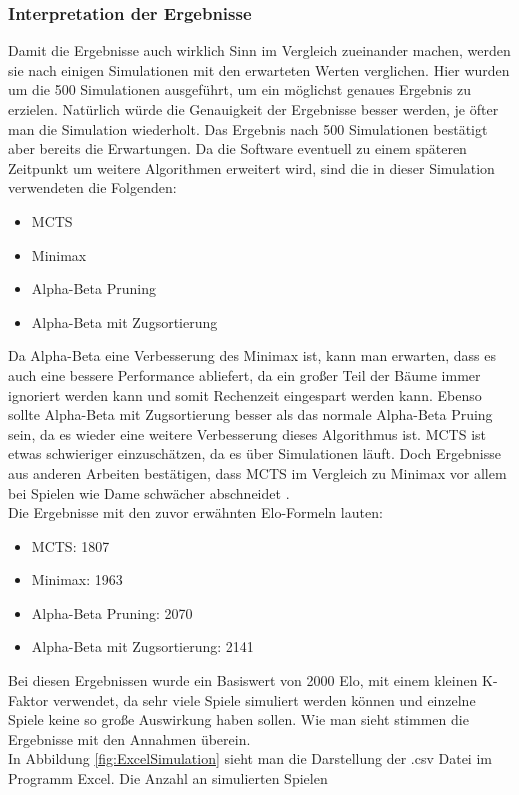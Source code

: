 \documentclass[12pt,a4paper,bibliography=totocnumbered,listof=totocnumbered]{article}
\begin{document}
\subsubsection{Interpretation der Ergebnisse}
Damit die Ergebnisse auch wirklich Sinn im Vergleich zueinander machen, werden sie nach einigen Simulationen mit den erwarteten Werten verglichen.
Hier wurden um die 500 Simulationen ausgeführt, um ein möglichst genaues Ergebnis zu erzielen. Natürlich würde die Genauigkeit der Ergebnisse 
besser werden, je öfter man die Simulation wiederholt. Das Ergebnis nach 500 Simulationen bestätigt aber bereits die Erwartungen.
Da die Software eventuell zu einem späteren Zeitpunkt um weitere Algorithmen erweitert wird, sind die in dieser Simulation verwendeten die Folgenden:
\begin{itemize}
    \item MCTS
    \item Minimax 
    \item Alpha-Beta Pruning
    \item Alpha-Beta mit Zugsortierung 
\end{itemize}
Da Alpha-Beta eine Verbesserung des Minimax ist, kann man erwarten, dass es auch eine bessere Performance abliefert, da ein großer Teil der Bäume 
immer ignoriert werden kann und somit Rechenzeit eingespart werden kann. Ebenso sollte Alpha-Beta mit Zugsortierung besser als das normale 
Alpha-Beta Pruing sein, da es wieder eine weitere Verbesserung dieses Algorithmus ist. MCTS ist etwas schwieriger einzuschätzen, da 
es über Simulationen läuft. Doch Ergebnisse aus anderen Arbeiten bestätigen, dass MCTS im Vergleich zu Minimax vor allem bei Spielen wie Dame 
schwächer abschneidet \cite{MiniaxMCTScomparison}.
\\
Die Ergebnisse mit den zuvor erwähnten Elo-Formeln lauten:
\begin{itemize}
    \item MCTS: 1807
    \item Minimax: 1963
    \item Alpha-Beta Pruning: 2070
    \item Alpha-Beta mit Zugsortierung: 2141
\end{itemize}
Bei diesen Ergebnissen wurde ein Basiswert von 2000 Elo, mit einem kleinen K-Faktor verwendet, da sehr viele Spiele simuliert werden können und 
einzelne Spiele keine so große Auswirkung haben sollen. Wie man sieht stimmen die Ergebnisse mit den Annahmen überein.
\\
In Abbildung \ref{fig:ExcelSimulation} sieht man die Darstellung der .csv Datei im Programm Excel. Die Anzahl an simulierten Spielen
\end{document}
